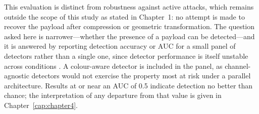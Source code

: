 This evaluation is distinct from robustness against active attacks, which remains outside the scope of this study as stated in Chapter~1: no attempt is made to recover the payload after compression or geometric transformation. The question asked here is narrower---whether the presence of a payload can be detected---and it is answered by reporting detection accuracy or AUC for a small panel of detectors rather than a single one, since detector performance is itself unstable across conditions \citep{alrusaini2025robustness}. A colour-aware detector is included in the panel, as channel-agnostic detectors would not exercise the property most at risk under a parallel architecture. Results at or near an AUC of 0.5 indicate detection no better than chance; the interpretation of any departure from that value is given in Chapter~\ref{cap:chapter4}.
